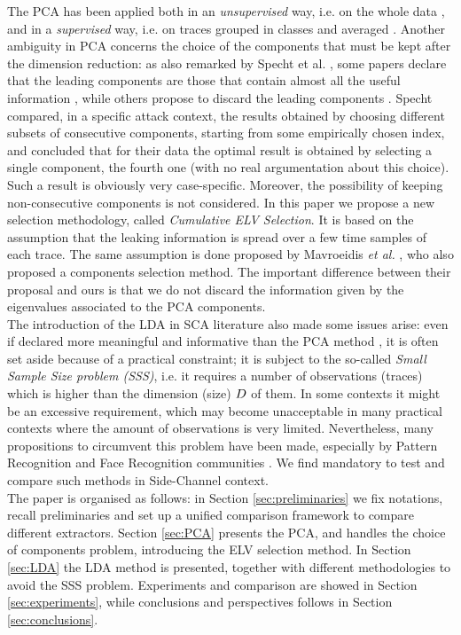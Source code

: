  The PCA has been applied both in an {\em unsupervised} way, i.e. on the whole data \cite{Batina2012,karsmakers2009side}, and in a {\em supervised} way, i.e. on traces grouped in classes and averaged \cite{TAprincipal,choudaryefficient,choudary2014efficient,disassembler,Standaert2008}. Another ambiguity in PCA concerns the choice of the components that must be kept after the dimension reduction: as also remarked by Specht et al.  \cite{specht}, some papers declare that the leading components are those that contain almost all the useful information \cite{TAprincipal}, while others propose to discard the leading components \cite{Batina2012}. Specht compared, in a specific attack context, the results obtained by choosing different subsets of consecutive components, starting from some empirically chosen index, and concluded that for their data the optimal result is obtained by selecting a single component, the fourth one (with no real argumentation about this choice). Such a result is obviously very case-specific. Moreover, the possibility of keeping non-consecutive components is not considered. In this paper we propose a new selection methodology, called {\em Cumulative ELV Selection}. It is based on the assumption that the leaking information is spread over a few time samples of each trace. The same assumption is done proposed by Mavroeidis \textit{et al.} \cite{SCAclassProbl}, who also proposed a components selection method. The important difference between their proposal and ours is that we do not discard the information given by the eigenvalues associated to the PCA components.  \\

The introduction of the LDA in SCA literature also made some issues arise: even if declared more meaningful and informative than the PCA method \cite{lessIsMore,Standaert2008}, it is often set aside because of a practical constraint; it is subject to the so-called {\em Small Sample Size problem (SSS)}, i.e. it requires a number of observations (traces) which is higher than the dimension (size) $D$ of them. In some contexts it might be an excessive requirement, which may become unacceptable in many practical contexts where the amount of observations is very limited. Nevertheless, many propositions to circumvent this problem have been made, especially by Pattern Recognition and Face Recognition communities \cite{eigenfaces,Chen2000,huang,Yu01adirect}. We find mandatory to test and compare such methods in Side-Channel context.\\

The paper is organised as follows: in Section \ref{sec:preliminaries} we fix notations, recall preliminaries and set up a unified comparison framework to compare different extractors. Section \ref{sec:PCA} presents the PCA, and handles the choice of components problem, introducing the  ELV selection method. In Section \ref{sec:LDA} the LDA method is presented, together with different methodologies to avoid the SSS problem. Experiments and comparison are showed in Section \ref{sec:experiments}, while conclusions and perspectives follows in Section \ref{sec:conclusions}. 

